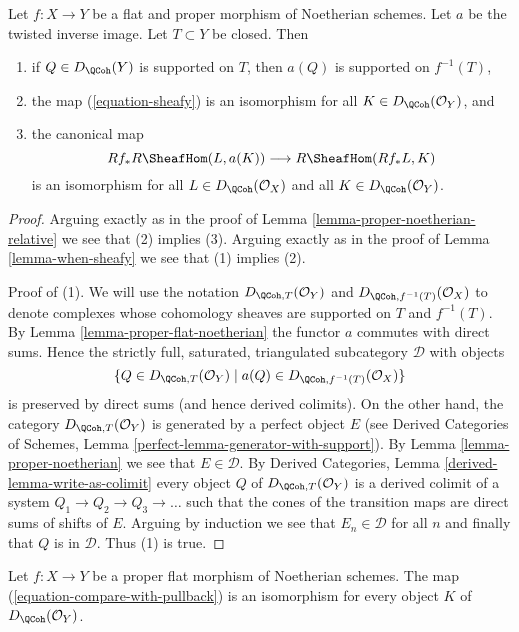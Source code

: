 \begin{lemma}
\label{lemma-proper-flat-noetherian-relative}
Let $f : X \to Y$ be a flat and proper morphism of Noetherian schemes.
Let $a$ be the twisted inverse image. Let $T \subset Y$ be closed. Then
\begin{enumerate}
\item if $Q \in D_\QCoh(Y)$ is supported on $T$,
then $a(Q)$ is supported on $f^{-1}(T)$,
\item the map (\ref{equation-sheafy}) is an isomorphism for all
$K \in D_\QCoh(\mathcal{O}_Y)$, and
\item the canonical map
$$
Rf_*R\SheafHom(L, a(K)) \longrightarrow R\SheafHom(Rf_*L, K)
$$
is an isomorphism for all $L \in D_\QCoh(\mathcal{O}_X)$ and all
$K \in D_\QCoh(\mathcal{O}_Y)$.
\end{enumerate}
\end{lemma}

\begin{proof}
Arguing exactly as in the proof of
Lemma \ref{lemma-proper-noetherian-relative}
we see that (2) implies (3).
Arguing exactly as in the proof of
Lemma \ref{lemma-when-sheafy}
we see that (1) implies (2).

\medskip\noindent
Proof of (1). We will use the notation $D_{\QCoh, T}(\mathcal{O}_Y)$ and
$D_{\QCoh, f^{-1}(T)}(\mathcal{O}_X)$ to denote complexes
whose cohomology sheaves are supported on $T$ and $f^{-1}(T)$.
By Lemma \ref{lemma-proper-flat-noetherian} the functor $a$ commutes
with direct sums. Hence the strictly full, saturated, triangulated
subcategory $\mathcal{D}$ with objects
$$
\{Q \in D_{\QCoh, T}(\mathcal{O}_Y) \mid
a(Q) \in D_{\QCoh, f^{-1}(T)}(\mathcal{O}_X)\}
$$
is preserved by direct sums (and hence derived colimits).
On the other hand, the
category $D_{\QCoh, T}(\mathcal{O}_Y)$ is generated by a perfect
object $E$ (see Derived Categories of Schemes, Lemma
\ref{perfect-lemma-generator-with-support}).
By Lemma \ref{lemma-proper-noetherian} we see that $E \in \mathcal{D}$.
By Derived Categories, Lemma \ref{derived-lemma-write-as-colimit}
every object $Q$ of $D_{\QCoh, T}(\mathcal{O}_Y)$ is a derived
colimit of a system $Q_1 \to Q_2 \to Q_3 \to \ldots$
such that the cones of the transition maps are direct sums
of shifts of $E$. Arguing by induction we see that
$E_n \in \mathcal{D}$ for all $n$ and finally that $Q$ is
in $\mathcal{D}$. Thus (1) is true.
\end{proof}

\begin{lemma}
\label{lemma-compare-with-pullback-flat-proper-noetherian}
Let $f : X \to Y$ be a proper flat morphism of Noetherian
schemes. The map (\ref{equation-compare-with-pullback}) is an isomorphism
for every object $K$ of $D_\QCoh(\mathcal{O}_Y)$.
\end{lemma}

